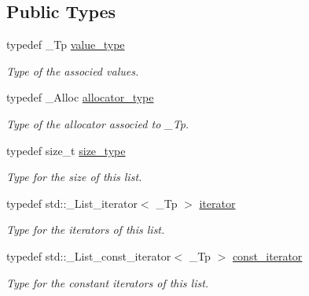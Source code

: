 \subsection*{Public Types}
\begin{DoxyCompactItemize}
\item 
\mbox{\label{classutils_1_1PointerList_af1c536b3d0d508b69700ad038ea5279a}} 
typedef \+\_\+\+Tp \hyperlink{classutils_1_1PointerList_af1c536b3d0d508b69700ad038ea5279a}{value\+\_\+type}
\begin{DoxyCompactList}\small\item\em Type of the associed values. \end{DoxyCompactList}\item 
\mbox{\label{classutils_1_1PointerList_a3b41bb503c3d41a7120b1a9cd1ba9848}} 
typedef \+\_\+\+Alloc \hyperlink{classutils_1_1PointerList_a3b41bb503c3d41a7120b1a9cd1ba9848}{allocator\+\_\+type}
\begin{DoxyCompactList}\small\item\em Type of the allocator associed to \+\_\+\+Tp. \end{DoxyCompactList}\item 
typedef size\+\_\+t \hyperlink{classutils_1_1PointerList_a8d7b485e236a01cc14b41694ae0b3456}{size\+\_\+type}
\begin{DoxyCompactList}\small\item\em Type for the size of this list. \end{DoxyCompactList}\item 
\mbox{\label{classutils_1_1PointerList_a05f57884241fe77050d177e9615501e3}} 
typedef std\+::\+\_\+\+List\+\_\+iterator$<$ \+\_\+\+Tp $>$ \hyperlink{classutils_1_1PointerList_a05f57884241fe77050d177e9615501e3}{iterator}
\begin{DoxyCompactList}\small\item\em Type for the iterators of this list. \end{DoxyCompactList}\item 
\mbox{\label{classutils_1_1PointerList_aec91f3c1085620fe3beaff9ecee67293}} 
typedef std\+::\+\_\+\+List\+\_\+const\+\_\+iterator$<$ \+\_\+\+Tp $>$ \hyperlink{classutils_1_1PointerList_aec91f3c1085620fe3beaff9ecee67293}{const\+\_\+iterator}
\begin{DoxyCompactList}\small\item\em Type for the constant iterators of this list. \end{DoxyCompactList}\end{DoxyCompactItemize}
